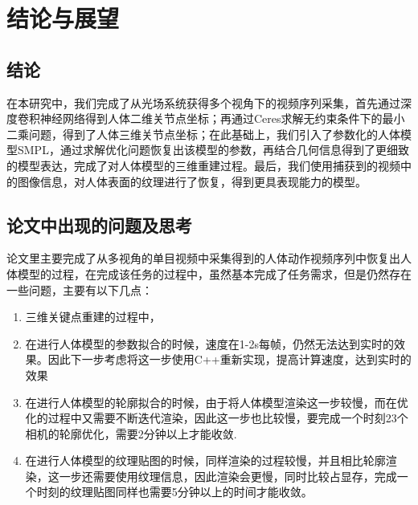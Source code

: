 












\section{结论与展望}
\subsection{结论}
在本研究中，我们完成了从光场系统获得多个视角下的视频序列采集，首先通过深度卷积神经网络得到人体二维关节点坐标；再通过Ceres求解无约束条件下的最小二乘问题，得到了人体三维关节点坐标；在此基础上，我们引入了参数化的人体模型SMPL，通过求解优化问题恢复出该模型的参数，再结合几何信息得到了更细致的模型表达，完成了对人体模型的三维重建过程。最后，我们使用捕获到的视频中的图像信息，对人体表面的纹理进行了恢复，得到更具表现能力的模型。

\subsection{论文中出现的问题及思考}
论文里主要完成了从多视角的单目视频中采集得到的人体动作视频序列中恢复出人体模型的过程，在完成该任务的过程中，虽然基本完成了任务需求，但是仍然存在一些问题，主要有以下几点：
\begin{enumerate}
    \item 三维关键点重建的过程中，
    \item 在进行人体模型的参数拟合的时候，速度在1-2s每帧，仍然无法达到实时的效果。因此下一步考虑将这一步使用C++重新实现，提高计算速度，达到实时的效果
    \item 在进行人体模型的轮廓拟合的时候，由于将人体模型渲染这一步较慢，而在优化的过程中又需要不断迭代渲染，因此这一步也比较慢，要完成一个时刻23个相机的轮廓优化，需要2分钟以上才能收敛.
    \item 在进行人体模型的纹理贴图的时候，同样渲染的过程较慢，并且相比轮廓渲染，这一步还需要使用纹理信息，因此渲染会更慢，同时比较占显存，完成一个时刻的纹理贴图同样也需要5分钟以上的时间才能收敛。
\end{enumerate}


